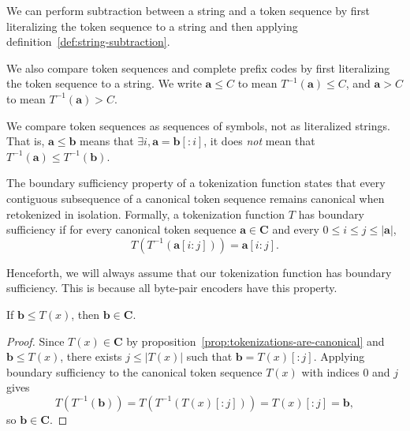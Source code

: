 \begin{definition}
    We can perform subtraction between a string and a token sequence by first literalizing the token sequence to a string and then applying definition~\ref{def:string-subtraction}.
\end{definition}

\begin{definition}
    We also compare token sequences and complete prefix codes by first literalizing the token
    sequence to a string. We write $\mathbf{a} \leq C$ to mean $T^{-1}(\mathbf{a}) \leq C$,
    and $\mathbf{a} > C$ to mean $T^{-1}(\mathbf{a}) > C$.
\end{definition}

\begin{definition}
    We compare token sequences as sequences of symbols, not as literalized strings.
    That is, $\mathbf{a} \leq \mathbf{b}$ means that
    $\exists i, \mathbf{a} = \mathbf{b}[:i]$,
    it does \emph{not} mean that $T^{-1}(\mathbf{a}) \leq T^{-1}(\mathbf{b})$.
\end{definition}


\begin{definition}
    The boundary sufficiency property of a tokenization function states that every contiguous
    subsequence of a canonical token sequence remains canonical when retokenized in isolation.
    Formally, a tokenization function $T$ has boundary sufficiency if for every canonical token
    sequence $\mathbf{a} \in \mathbf{C}$ and every $0 \leq i \leq j \leq |\mathbf{a}|$,
    $$
    T(T^{-1}(\mathbf{a}[i:j])) = \mathbf{a}[i:j].
    $$
\end{definition}

Henceforth, we will always assume that our tokenization function has boundary sufficiency.
This is because all byte-pair encoders have this property.

\begin{proposition}
\label{prop:tokenization-prefixes-are-canonical}
    If $\mathbf{b} \leq T(x)$, then $\mathbf{b} \in \mathbf{C}$.
\end{proposition}
\begin{proof}
    Since $T(x) \in \mathbf{C}$ by proposition~\ref{prop:tokenizations-are-canonical} and $\mathbf{b} \leq T(x)$, there exists $j \leq |T(x)|$ such that
    $\mathbf{b} = T(x)[:j]$. Applying boundary sufficiency to the canonical token sequence $T(x)$
    with indices $0$ and $j$ gives
    $$
    T(T^{-1}(\mathbf{b}))
    =
    T(T^{-1}(T(x)[:j]))
    =
    T(x)[:j]
    =
    \mathbf{b},
    $$
    so $\mathbf{b} \in \mathbf{C}$.
\end{proof}

